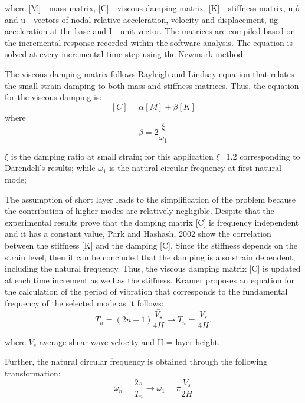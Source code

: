 	where [M] - mass matrix, [C] - viscous damping matrix, [K] - stiffness matrix, {ü},{ů} and {u} - vectors of nodal relative acceleration, velocity and displacement, üg - acceleration at the base and {I} - unit vector. The matrices are compiled based on the incremental response recorded within the software analysis. The equation is solved at every incremental time step using the Newmark method.
	
	The viscous damping matrix follows Rayleigh and Lindsay equation that relates the small strain damping to both mass and stiffness matrices. Thus, the equation for the viscous damping is:
	\begin{equation}
	\left[C\right]=\alpha\left[M\right]+\beta\left[K\right]
	\end{equation}
	where
	\begin{equation}
	\beta = 2\frac{\xi}{\omega_1}
	\end{equation}
	
	
	$\xi$ is the damping ratio at small strain; for this application $\xi$=1.2 corresponding to Darendeli's results; while $\omega_1$ is the natural circular frequency at first natural mode;
	
	The assumption of short layer leads to the simplification of the problem because the contribution of higher modes are relatively negligible. Despite that the experimental results prove that the damping matrix [C] is frequency independent and it has a constant value, Park and Hashash, 2002 \cite{hashash2002viscous} show the correlation between the stiffness [K] and the damping [C]. Since the stiffness depends on the strain level, then it can be concluded that the damping is also strain dependent, including the natural frequency. Thus, the viscous damping matrix [C] is updated at each time increment as well as the stiffness. Kramer proposes an equation for the calculation of the period of vibration that corresponds to the fundamental frequency of the selected mode as it follows:
	\begin{equation}
	T_n=(2n-1)\frac{\stackrel{-}{{V}_{s}}}{4H}\longrightarrow T_n=\frac{V_s}{4H}.
	\end{equation}
	
	where $\stackrel{-}{{V}_{s}}$ average shear wave velocity and H = layer height.
	
	Further, the natural circular frequency is obtained through the following transformation:
	\begin{equation}
	\omega_n=\frac{2\pi}{T_n} \rightarrow \omega_1=\pi\frac{V_s}{2H}
	\end{equation}
	
